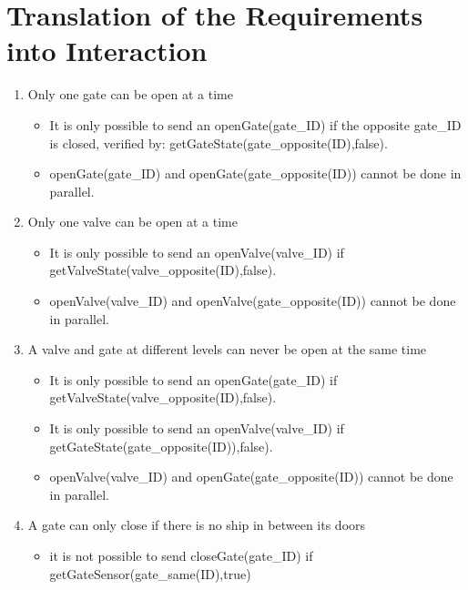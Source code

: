 \section{Translation of the Requirements into Interaction}
\begin{enumerate}
	\item Only one gate can be open at a time
	
		\begin{itemize}
			\item It is only possible to send an openGate(gate\_ID) if the opposite gate\_ID is closed, verified by: getGateState(gate\_opposite(ID),false).
			\item openGate(gate\_ID) and openGate(gate\_opposite(ID)) cannot be done in parallel.
			
		\end{itemize}
	
	\item Only one valve can be open at a time
	
		\begin{itemize}
			\item It is only possible to send an openValve(valve\_ID) if getValveState(valve\_opposite(ID),false).
			\item openValve(valve\_ID) and openValve(gate\_opposite(ID)) cannot be done in parallel.
		\end{itemize}
	
	\item A valve and gate at different levels can never be open at the same time
		\begin{itemize}
			\item It is only possible to send an openGate(gate\_ID) if getValveState(valve\_opposite(ID),false).
			\item It is only possible to send an openValve(valve\_ID) if getGateState(gate\_opposite(ID)),false).
			\item openValve(valve\_ID) and openGate(gate\_opposite(ID)) cannot be done in parallel.
		\end{itemize}
	
	
	\item A gate can only close if there is no ship in between its doors
	\begin{itemize}
		\item it is not possible to send closeGate(gate\_ID) if getGateSensor(gate\_same(ID),true)
	\end{itemize}
	

\end{enumerate}
